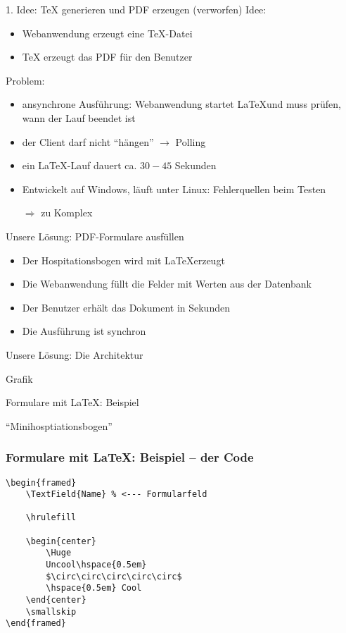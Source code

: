 \documentclass{beamer}
\begin{document}
\begin{frame}{1. Idee: TeX generieren und PDF erzeugen (verworfen)}
Idee:
\begin{itemize}
	\item Webanwendung erzeugt eine TeX-Datei
	\item TeX erzeugt das PDF für den Benutzer
\end{itemize}
Problem:
\begin{itemize}
\item ansynchrone Ausführung: Webanwendung startet \LaTeX und muss prüfen, wann der Lauf beendet ist
\item der Client darf nicht \enquote{hängen} $\to$ Polling
\item ein \LaTeX -Lauf dauert ca. $30 - 45$ Sekunden
\item Entwickelt auf Windows, läuft unter Linux: Fehlerquellen beim Testen
\item[$\Rightarrow$] zu Komplex
\end{itemize}
\end{frame}

\begin{frame}{Unsere Lösung: PDF-Formulare ausfüllen}
\begin{itemize}
\item Der Hospitationsbogen wird mit \LaTeX erzeugt
\item Die Webanwendung füllt die Felder mit Werten aus der Datenbank
\item Der Benutzer erhält das Dokument in Sekunden
\item Die Ausführung ist synchron
\end{itemize}
\end{frame}

\begin{frame}{Unsere Lösung: Die Architektur}
\begin{center}
\Huge
Grafik
\end{center}
\end{frame}


\begin{frame}{Formulare mit \LaTeX: Beispiel}
	\begin{center}
	\Huge
	\enquote{Minihosptiationsbogen}
	\end{center}
\end{frame}

\begin{frame}[fragile]{}
\frametitle{Formulare mit \LaTeX: Beispiel -- der Code}

\begin{verbatim}
\begin{framed}
    \TextField{Name} % <--- Formularfeld

    \hrulefill

    \begin{center}
        \Huge
        Uncool\hspace{0.5em}
        $\circ\circ\circ\circ\circ$
        \hspace{0.5em} Cool
    \end{center}
    \smallskip
\end{framed}
\end{verbatim}
\end{frame}
\end{document}

